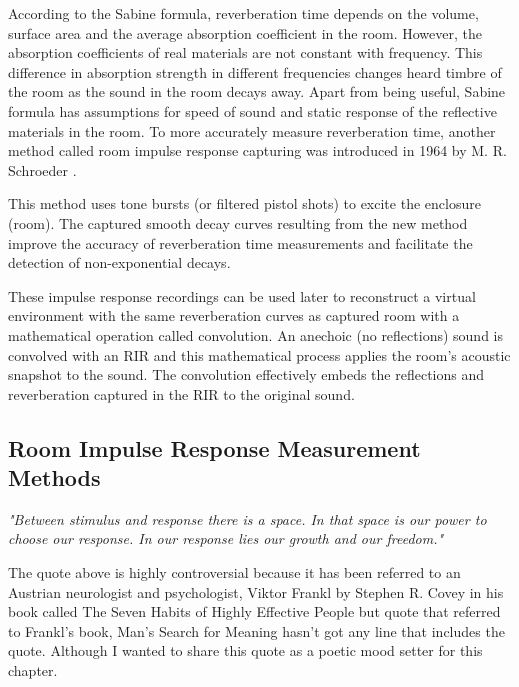             According to the Sabine formula, reverberation time depends on the volume, surface area and the average absorption coefficient in the room. However, the absorption coefficients of real materials are not constant with frequency. This difference in absorption strength in different frequencies changes heard timbre of the room as the sound in the room decays away. Apart from being useful, Sabine formula has assumptions for speed of sound and static response of the reflective materials in the room. To more accurately measure reverberation time, another method called room impulse response capturing was introduced in 1964 by M. R. Schroeder \cite{New_Method_Measuring_RT}.\par

            This method uses tone bursts (or filtered pistol shots) to excite the enclosure (room). The captured smooth decay curves resulting from the new method improve the accuracy of reverberation time measurements and facilitate the detection of non-exponential decays\cite{New_Method_Measuring_RT}.\par

            These impulse response recordings can be used later to reconstruct a virtual environment with the same reverberation curves as captured room with a mathematical operation called convolution. An anechoic (no reflections) sound is convolved with an RIR and this mathematical process applies the room's acoustic snapshot to the sound. The convolution effectively embeds the reflections and reverberation captured in the RIR to the original sound.\par
        \subsection{Room Impulse Response Measurement Methods}
            \emph{"Between stimulus and response there is a space. In that space is our power to choose our response. In our response lies our growth and our freedom."\cite{Sonic_Interaction_in_Virtual_Environments}}

            The quote above is highly controversial because it has been referred to an Austrian neurologist and psychologist, Viktor Frankl by Stephen R. Covey in his book called The Seven Habits of Highly Effective People but quote that referred to Frankl's book, Man’s Search for Meaning hasn't got any line that includes the quote. Although I wanted to share this quote as a poetic mood setter for this chapter.\par

